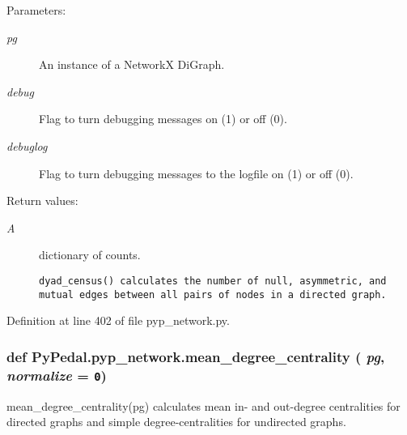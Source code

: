 \begin{Desc}
\item[Parameters:]
\begin{description}
\item[{\em pg}]An instance of a Network\-X Di\-Graph. \item[{\em debug}]Flag to turn debugging messages on (1) or off (0). \item[{\em debuglog}]Flag to turn debugging messages to the logfile on (1) or off (0). \end{description}
\end{Desc}
\begin{Desc}
\item[Return values:]
\begin{description}
\item[{\em A}]dictionary of counts.

\footnotesize\begin{verbatim}dyad_census() calculates the number of null, asymmetric, and
mutual edges between all pairs of nodes in a directed graph.
\end{verbatim}
\normalsize
 \end{description}
\end{Desc}


Definition at line 402 of file pyp\_\-network.py.\hypertarget{namespacePyPedal_1_1pyp__network_563bee26515afbda191df8558489964d}{
\subsubsection[mean\_\-degree\_\-centrality]{\setlength{\rightskip}{0pt plus 5cm}def Py\-Pedal.pyp\_\-network.mean\_\-degree\_\-centrality ( {\em pg},  {\em normalize} = {\tt 0})}}
\label{namespacePyPedal_1_1pyp__network_563bee26515afbda191df8558489964d}


mean\_\-degree\_\-centrality(pg) calculates mean in- and out-degree centralities for directed graphs and simple degree-centralities for undirected graphs. 

